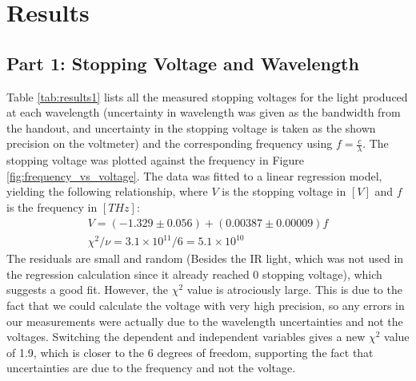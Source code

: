 \section{Results}
\subsection{Part 1: Stopping Voltage and Wavelength}
\label{sec:results1}
Table \ref{tab:results1} lists all the measured stopping voltages for the light produced at each wavelength (uncertainty in wavelength was given as the bandwidth from the handout, and uncertainty in the stopping voltage is taken as the shown precision on the voltmeter) and the corresponding frequency using $f = \frac{c}{\lambda}$. The stopping voltage was plotted against the frequency in Figure \ref{fig:frequency_vs_voltage}. The data was fitted to a linear regression model, yielding the following relationship, where $V$ is the stopping voltage in $[V]$ and $f$ is the frequency in $[THz]$:
\begin{gather}
    V = (-1.329 \pm 0.056) + (0.00387 \pm 0.00009)f \\
    \chi^2 / \nu = 3.1 \times 10^{11} / 6 = 5.1 \times 10^{10}
\end{gather}
The residuals are small and random (Besides the IR light, which was not used in the regression calculation since it already reached 0 stopping voltage), which suggests a good fit. However, the $\chi^2$ value is atrociously large. This is due to the fact that we could calculate the voltage with very high precision, so any errors in our measurements were actually due to the wavelength uncertainties and not the voltages. Switching the dependent and independent variables gives a new $\chi^2$ value of 1.9, which is closer to the 6 degrees of freedom, supporting the fact that uncertainties are due to the frequency and not the voltage.

